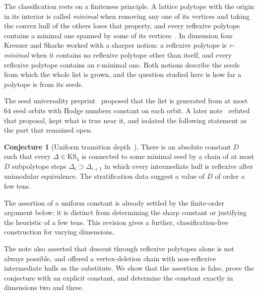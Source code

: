 \documentclass[manuscript]{aomart}
\theoremstyle{definition}
\newtheorem{conjecture}[theorem]{Conjecture}
\theoremstyle{remark}
\newcommand{\KS}{\mathrm{KS}}
\begin{document}
The classification rests on a finiteness principle. A lattice polytope with
the origin in its interior is called \emph{minimal} when removing any one
of its vertices and taking the convex hull of the others loses that
property, and every reflexive polytope contains a minimal one spanned by
some of its vertices~\cite{KS97,KS00}. In dimension four Kreuzer and
Skarke worked with a sharper notion: a reflexive polytope is
\emph{r-minimal} when it contains no reflexive polytope other than itself,
and every reflexive polytope contains an r-minimal one. Both notions
describe the seeds from which the whole list is grown, and the question
studied here is how far a polytope is from its seeds.

The seed universality preprint~\cite{Bha26a} proposed that the list is
generated from at most $64$ seed orbits with Hodge numbers constant on each
orbit. A later note~\cite{Bha26b} refuted that proposal, kept what is true
near it, and isolated the following statement as the part that remained
open.

\begin{conjecture}[Uniform transition depth~\cite{Bha26b}]\label{conj:depth}
There is an absolute constant $D$ such that every $\Delta\in\KS_4$ is
connected to some minimal seed by a chain of at most $D$ subpolytope steps
$\Delta_i\supset\Delta_{i+1}$ in which every intermediate hull is
reflexive after unimodular equivalence. The stratification data suggest a
value of $D$ of order a few tens.
\end{conjecture}

The assertion of a uniform constant is already settled by the finite-order
argument below; it is distinct from determining the sharp constant or
justifying the heuristic of a few tens. This revision gives a further,
classification-free construction for varying dimensions.

The note also asserted that descent through reflexive polytopes alone is
not always possible, and offered a vertex-deletion chain with
non-reflexive intermediate hulls as the substitute. We show that the
assertion is false, prove the conjecture with an explicit constant, and
determine the constant exactly in dimensions two and three.
\end{document}
